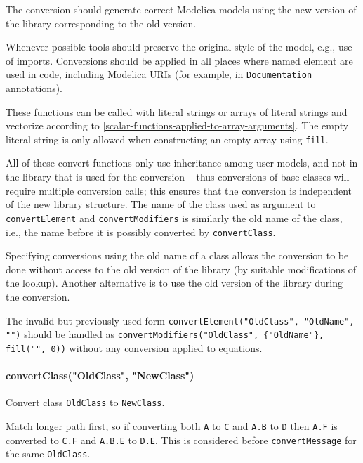 The conversion should generate correct Modelica models using the new version of the library corresponding to the old version.

\begin{nonnormative}
Whenever possible tools should preserve the original style of the model, e.g., use of imports.
Conversions should be applied in all places where named element are used in code, including Modelica URIs (for example, in \lstinline!Documentation! annotations).
\end{nonnormative}

These functions can be called with literal strings or arrays of literal strings and vectorize according to \cref{scalar-functions-applied-to-array-arguments}.
The empty literal string is only allowed when constructing an empty array using \lstinline!fill!.

All of these convert-functions only use inheritance among user models, and not in the library that is used for the conversion -- thus conversions of base classes will require multiple conversion calls; this ensures that the conversion is independent of the new library structure.
The name of the class used as argument to \lstinline!convertElement! and \lstinline!convertModifiers! is similarly the old name of the class, i.e., the name before it is possibly converted by \lstinline!convertClass!.

\begin{nonnormative}
Specifying conversions using the old name of a class allows the conversion to be done without access to the old version of the library (by suitable modifications of the lookup).
Another alternative is to use the old version of the library during the conversion.

The invalid but previously used form \lstinline!convertElement("OldClass", "OldName", "")! should be handled as \lstinline!convertModifiers("OldClass", {"OldName"}, fill("", 0))! without any conversion applied to equations.
\end{nonnormative}

\paragraph*{convertClass("OldClass", "NewClass")}\label{convertclassoldclassnewclass}

Convert class \lstinline!OldClass! to \lstinline!NewClass!.

Match longer path first, so if converting both \lstinline!A! to \lstinline!C! and \lstinline!A.B! to \lstinline!D! then \lstinline!A.F! is converted to \lstinline!C.F! and \lstinline!A.B.E! to \lstinline!D.E!.
This is considered before \lstinline!convertMessage! for the same \lstinline!OldClass!.


